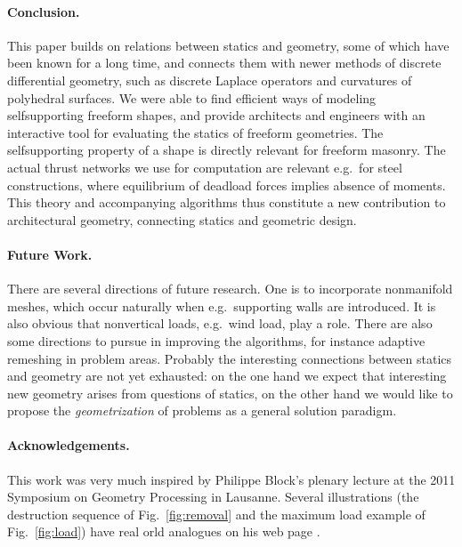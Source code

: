 \documentclass[review]{acmsiggraph}
\begin{document}
\paragraph{Conclusion.}

This paper builds on relations between statics and geometry, some of which
have been known for a long time, and connects them with newer methods of
discrete differential geometry, such as discrete Laplace operators and
curvatures of polyhedral surfaces. We were able to find efficient ways of
modeling self\dash supporting freeform shapes, and provide architects and
engineers with an interactive tool for evaluating the
statics of freeform geometries. The self\dash supporting property of a
shape is directly relevant for freeform masonry. The actual thrust
networks we use for computation are relevant e.g.\ for steel
constructions, where equilibrium of deadload forces implies absence of
moments. This theory and accompanying algorithms thus constitute a new
contribution to architectural geometry, connecting statics and geometric
design.

\paragraph{Future Work.}

There are several directions of future research. One is to incorporate
non\dash manifold meshes, which occur naturally when e.g.\ supporting
walls are introduced. It is also obvious that non\dash vertical loads,
e.g.\ wind load, play a role. There are also some directions to pursue in
improving the algorithms, for instance adaptive remeshing in problem
areas. Probably the interesting connections between statics and
geometry are not yet exhausted: on the one hand we expect that interesting
new geometry arises from questions of statics, on the other hand
we would like to propose the {\em
geometrization} of problems as a general solution paradigm.

\paragraph*{Acknowledgements.}

This work was very much inspired by Philippe Block's plenary lecture
at the 2011 Symposium on Geometry Processing in Lausanne. Several
illustrations (the destruction sequence of Fig.~\ref{fig:removal}
and the maximum load example of Fig.~\ref{fig:load}) have real\dash 
orld analogues on his web page \cite{catalan}.
\end{document}
